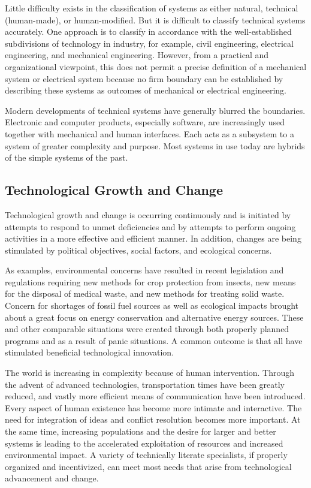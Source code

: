 Little difficulty exists in the classification of systems as either natural, technical (human-made), or human-modified. But it is difficult to classify technical systems accurately. One approach is to classify in accordance with the well-established subdivisions of technology in industry, for example, civil engineering, electrical engineering, and mechanical engineering. However, from a practical and organizational viewpoint, this does not permit a precise definition of a mechanical system or electrical system because no firm boundary can be established by describing these systems as outcomes of mechanical or electrical engineering.

Modern developments of technical systems have generally blurred the boundaries. Electronic and computer products, especially software, are increasingly used together with mechanical and human interfaces. Each acts as a subsystem to a system of greater complexity and purpose. Most systems in use today are hybrids of the simple systems of the past.

\subsection{Technological Growth and Change}

Technological growth and change is occurring continuously and is initiated by attempts to respond to unmet deficiencies and by attempts to perform ongoing activities in a more effective and efficient manner. In addition, changes are being stimulated by political objectives, social factors, and ecological concerns.

As examples, environmental concerns have resulted in recent legislation and regulations requiring new methods for crop protection from insects, new means for the disposal of medical waste, and new methods for treating solid waste. Concern for shortages of fossil fuel sources as well as ecological impacts brought about a great focus on energy conservation and alternative energy sources. These and other comparable situations were created through both properly planned programs and as a result of panic situations. A common outcome is that all have stimulated beneficial technological innovation.

The world is increasing in complexity because of human intervention. Through the advent of advanced technologies, transportation times have been greatly reduced, and vastly more efficient means of communication have been introduced. Every aspect of human existence has become more intimate and interactive. The need for integration of ideas and conflict resolution becomes more important. At the same time, increasing populations and the desire for larger and better systems is leading to the accelerated exploitation of resources and increased environmental impact. A variety of technically literate specialists, if properly organized and incentivized, can meet most needs that arise from technological advancement and change.

